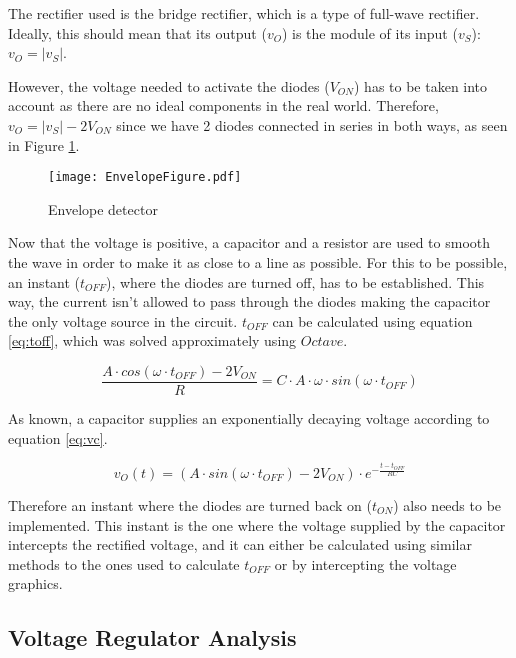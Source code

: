 The rectifier used is the bridge rectifier, which is a type of full-wave rectifier. Ideally, this should mean that its output ($v_O$) is the module of its input ($v_S$): $v_O=|v_S|$.

However, the voltage needed to activate the diodes ($V_{ON}$) has to be taken into account as there are no ideal components in the real world.
Therefore, $v_O=|v_S| - 2V_{ON}$ since we have 2 diodes connected in series in both ways, as seen in Figure \ref{fig:BR}.



\begin{figure}[H]
    \centering
    \texttt{[image: EnvelopeFigure.pdf]}
    \caption{Envelope detector}
    \label{fig:BR}
\end{figure}

Now that the voltage is positive, a capacitor and a resistor are used to smooth the wave in order to make it as close to a line as possible. For this to be possible, an instant ($t_{OFF}$), where the diodes are turned off, has to be established. This way, the current isn't allowed to pass through the diodes making the capacitor the only voltage source in the circuit. $t_{OFF}$ can be calculated using equation \ref{eq:toff}, which was solved approximately using $Octave$.

\begin{equation}
    \frac{A\cdot cos(\omega \cdot t_{OFF})-2V_{ON}}{R}=C\cdot A\cdot \omega \cdot sin(\omega \cdot t_{OFF})
    \label{eq:toff}
\end{equation}

As known, a capacitor supplies an exponentially decaying voltage according to equation \ref{eq:vc}.

\begin{equation}
    v_O(t)=(A\cdot sin(\omega\cdot t_{OFF})-2V_{ON})\cdot e ^{-\frac{t-t_{OFF}}{RC}}
    \label{eq:vc}
\end{equation}

Therefore an instant where the diodes are turned back on ($t_{ON}$) also needs to be implemented. This instant is the one where the voltage supplied by the capacitor intercepts the rectified voltage, and it can either be calculated using similar methods to the ones used to calculate $t_{OFF}$ or by intercepting the voltage graphics. 


\subsection{Voltage Regulator Analysis}
\label{subsection:VR_analysis}
\indent

